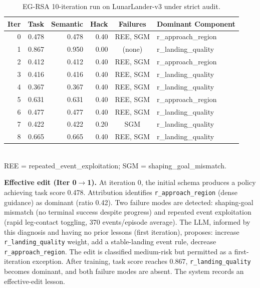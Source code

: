 \documentclass[11pt]{article}
\begin{document}
\begin{table}[t]
\centering
\caption{EG-RSA 10-iteration run on LunarLander-v3 under strict audit.}
\label{tab:strict-audit}
\begin{tabular}{r r r r c l}
\toprule
Iter & Task & Semantic & Hack & Failures & Dominant Component \\
\midrule
0 & 0.478 & 0.478 & 0.40 & REE, SGM & r\_approach\_region \\
1 & 0.867 & 0.950 & 0.00 & (none) & r\_landing\_quality \\
2 & 0.412 & 0.412 & 0.40 & REE, SGM & r\_approach\_region \\
3 & 0.416 & 0.416 & 0.40 & REE, SGM & r\_landing\_quality \\
4 & 0.367 & 0.367 & 0.40 & REE, SGM & r\_landing\_quality \\
5 & 0.631 & 0.631 & 0.40 & REE, SGM & r\_approach\_region \\
6 & 0.477 & 0.477 & 0.40 & REE, SGM & r\_landing\_quality \\
7 & 0.422 & 0.422 & 0.20 & SGM & r\_landing\_quality \\
8 & 0.665 & 0.665 & 0.40 & REE, SGM & r\_landing\_quality \\
\bottomrule
\end{tabular}
\smallskip\\
{\footnotesize REE = repeated\_event\_exploitation; SGM = shaping\_goal\_mismatch.}
\end{table}

\textbf{Effective edit (Iter 0$\to$1).} At iteration 0, the initial schema produces a policy achieving task score 0.478. Attribution identifies \texttt{r\_approach\_region} (dense guidance) as dominant (ratio 0.42). Two failure modes are detected: shaping-goal mismatch (no terminal success despite progress) and repeated event exploitation (rapid leg-contact toggling, 370 events/episode average). The LLM, informed by this diagnosis and having no prior lessons (first iteration), proposes: increase \texttt{r\_landing\_quality} weight, add a stable-landing event rule, decrease \texttt{r\_approach\_region}. The edit is classified medium-risk but permitted as a first-iteration exception. After training, task score reaches 0.867, \texttt{r\_landing\_quality} becomes dominant, and both failure modes are absent. The system records an effective-edit lesson.
\end{document}

